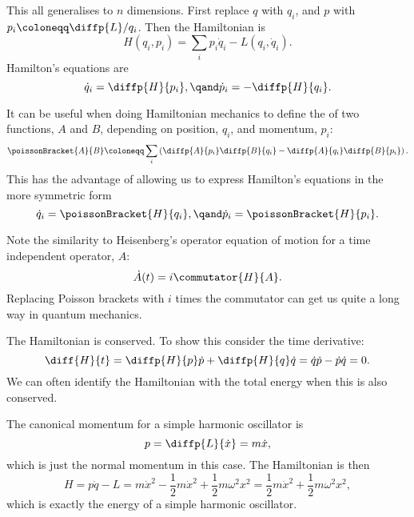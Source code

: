 \documentclass[fleqn]{NotesClass}
\newcommand{\lagrangian}{L}
\begin{document}
    This all generalises to \(n\) dimensions.
    First replace \(q\) with \(q_i\), and \(p\) with \(p_i \coloneqq \diffp{\lagrangian}/{q_i}\).
    Then the Hamiltonian is
    \begin{equation}
        H(q_i, p_i) = \sum_i p_i \dot{q}_i - \lagrangian(q_i, \dot{q}_i).
    \end{equation}
    Hamilton's equations are
    \begin{equation}
        \dot{q}_i = \diffp{H}{p_i}, \qand \dot{p}_i = -\diffp{H}{q_i}.
    \end{equation}
    
    It can be useful when doing Hamiltonian mechanics to define the  of two functions, \(A\) and \(B\), depending on position, \(q_i\), and momentum, \(p_i\):
    \begin{equation}
        \poissonBracket{A}{B} \coloneqq \sum_i \left( \diffp{A}{p_i}\diffp{B}{q_i} - \diffp{A}{q_i}\diffp{B}{p_i} \right).
    \end{equation}
    This has the advantage of allowing us to express Hamilton's equations in the more symmetric form
    \begin{equation}\label{eqn:hamilton's equations with poisson brackets}
        \dot{q}_i = \poissonBracket{H}{q_i}, \qand \dot{p}_i = \poissonBracket{H}{p_i}.
    \end{equation}
    
    Note the similarity to Heisenberg's operator equation of motion for a time independent operator, \(A\):
    \begin{equation}
        \dot{A}(t) = i \commutator{H}{A}.
    \end{equation}
    Replacing Poisson brackets with \(i\) times the commutator can get us quite a long way in quantum mechanics.
    
    The Hamiltonian is conserved.
    To show this consider the time derivative:
    \begin{equation}
        \diff{H}{t} = \diffp{H}{p} \dot{p} + \diffp{H}{q} \dot{q} = \dot{q}\dot{p} - \dot{p}\dot{q} = 0.
    \end{equation}
    We can often identify the Hamiltonian with the total energy when this is also conserved.
    
    \begin{exm}{}{}
        The canonical momentum for a simple harmonic oscillator is
        \begin{equation}
            p = \diffp{\lagrangian}{\dot{x}} = m\dot{x},
        \end{equation}
        which is just the normal momentum in this case.
        The Hamiltonian is then
        \begin{equation}
            H = p\dot{q} - \lagrangian = m\dot{x}^2 - \frac{1}{2}m\dot{x}^2 + \frac{1}{2}m\omega^2x^2 = \frac{1}{2}m\dot{x}^2 + \frac{1}{2}m\omega^2x^2,
        \end{equation}
        which is exactly the energy of a simple harmonic oscillator.
    \end{exm}
    
\end{document}
